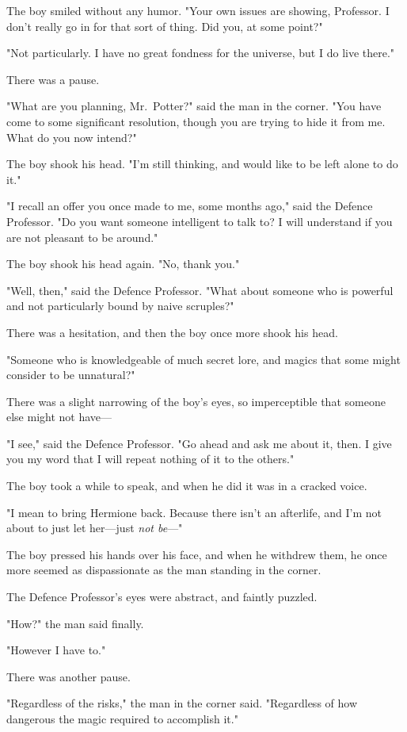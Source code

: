 The boy smiled without any humor. "Your own issues are showing, Professor. I
don't really go in for that sort of thing. Did you, at some point?"

"Not particularly. I have no great fondness for the universe, but I do live
there."

There was a pause.

"What are you planning, Mr.~Potter?" said the man in the corner. "You have come
to some significant resolution, though you are trying to hide it from me. What
do you now intend?"

The boy shook his head. "I'm still thinking, and would like to be left alone to
do it."

"I recall an offer you once made to me, some months ago," said the Defence
Professor. "Do you want someone intelligent to talk to? I will understand if
you are not pleasant to be around."

The boy shook his head again. "No, thank you."

"Well, then," said the Defence Professor. "What about someone who is powerful
and not particularly bound by naive scruples?"

There was a hesitation, and then the boy once more shook his head.

"Someone who is knowledgeable of much secret lore, and magics that some might
consider to be unnatural?"

There was a slight narrowing of the boy's eyes, so imperceptible that someone
else might not have---

"I see," said the Defence Professor. "Go ahead and ask me about it, then. I
give you my word that I will repeat nothing of it to the others."

The boy took a while to speak, and when he did it was in a cracked voice.

"I mean to bring Hermione back. Because there isn't an afterlife, and I'm not
about to just let her---just \emph{not be}---"

The boy pressed his hands over his face, and when he withdrew them, he once
more seemed as dispassionate as the man standing in the corner.

The Defence Professor's eyes were abstract, and faintly puzzled.

"How?" the man said finally.

"However I have to."

There was another pause.

"Regardless of the risks," the man in the corner said. "Regardless of how
dangerous the magic required to accomplish it."

